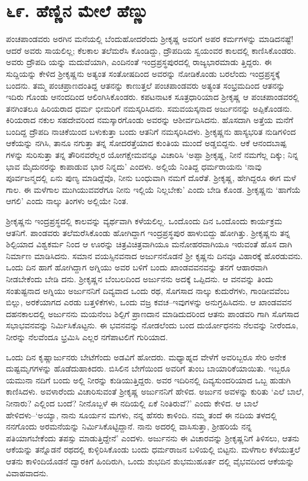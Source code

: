 
\chapter{೬೯. ಹೆಣ್ಣಿನ ಮೇಲೆ ಹೆಣ್ಣು}

ಪಂಚಪಾಂಡವರು ಅರಗಿನ ಮನೆಯಲ್ಲಿ ಬೆಂದುಹೋದರೆಂದು ಶ್ರೀಕೃಷ್ಣ ಅವರಿಗೆ ಅಪರ ಕರ್ಮಗಳನ್ನು ಮಾಡಿದನಷ್ಟೆ! ಆದರೆ ಅವರು ಸಾಯಲಿಲ್ಲ; ಕೆಲಕಾಲ ತಲೆಮರೆಸಿ ಕೊಂಡಿದ್ದು, ದ್ರೌಪದಿಯ ಸ್ವಯಂವರ ಕಾಲದಲ್ಲಿ ಕಾಣಿಸಿಕೊಂಡರು. ಅವರು ದ್ರೌಪದಿ ಯನ್ನು ಮದುವೆಯಾಗಿ, ಎಂದಿನಂತೆ ಇಂದ್ರಪ್ರಸ್ಥಪುರದಲ್ಲಿ ರಾಜ್ಯಭಾರಮಾಡು ತ್ತಿದ್ದರು. ಈ ಸುದ್ದಿಯನ್ನು ಕೇಳಿದ ಶ್ರೀಕೃಷ್ಣನು ಅತ್ಯಂತ ಸಂತೋಷದಿಂದ ಅವರನ್ನು ನೋಡಿಕೊಂಡು ಬರಲೆಂದು ಇಂದ್ರಪ್ರಸ್ಥಕ್ಕೆ ಬಂದನು. ತಮ್ಮ ಪಂಚಪ್ರಾಣದಂತಿದ್ದ ಆತನನ್ನು ಕಾಣುತ್ತಲೆ ಪಂಚಪಾಂಡವರು ಅತ್ಯಂತ ಸಂಭ್ರಮದಿಂದ ಆತನನ್ನು ಇದಿರು ಗೊಂಡು ಆನಂದದಿಂದ ಆಲಿಂಗಿಸಿಕೊಂಡರು. ಕಪಟನಾಟಕ ಸೂತ್ರಧಾರಿಯಾದ ಶ್ರೀಕೃಷ್ಣ ಆ ಪಂಚಪಾಂಡವರಲ್ಲಿ ತನಗಿಂತಲೂ ಹಿರಿಯರಾದ ಧರ್ಮ ಭೀಮರಿಗೆ ನಮಸ್ಕರಿಸಿದನು. ಸಮವಯಸ್ಕನಾದ ಅರ್ಜುನನನ್ನು ಅಪ್ಪಿಕೊಂಡನು. ಕಿರಿಯರಾದ ನಕುಲ ಸಹದೇವರಿಂದ ನಮಸ್ಕಾರಗೊಂಡು ಅವರನ್ನು ಆಶೀರ್ವದಿಸಿದನು. ಹೊಸದಾಗಿ ಅತ್ತೆಯ ಮನೆಗೆ ಬಂದಿದ್ದ ದ್ರೌಪದಿ ನಾಚಿಕೆಯಿಂದ ಬಳುಕುತ್ತಾ ಬಂದು ಆತನಿಗೆ ನಮಸ್ಕರಿಸಿದಳು. ಶ್ರೀಕೃಷ್ಣನು ಹಾಸ್ಯಭರಿತ ನುಡಿಗಳಿಂದ ಆಕೆಯನ್ನು ನಗಿಸಿ, ತಾನೂ ನಗುತ್ತಾ ತನ್ನ ಸೋದರತ್ತೆಯಾದ ಕುಂತಿಯ ಮುಂದೆ ಅಡ್ಡಬಿದ್ದನು. ಆಕೆ ಆನಂದಬಾಷ್ಪ ಗಳನ್ನು ಸುರಿಸುತ್ತಾ ತನ್ನ ತೌರಿನವರೆಲ್ಲರ ಯೋಗಕ್ಷೇಮವನ್ನೂ ವಿಚಾರಿಸಿ ‘ಅಪ್ಪಾ ಶ್ರೀಕೃಷ್ಣ, ನೀನೆ ನಮಗೆಲ್ಲ ದಿಕ್ಕು; ನಿನ್ನ ಭಾವ ಮೈದುನರನ್ನು ಕಾಪಾಡುವ ಭಾರ ನಿನ್ನದು’ ಎಂದಳು. ಅಲ್ಲಿಯೆ ನಿಂತಿದ್ದ ಧರ್ಮರಾಯನು ‘ನಾವು ಪೂರ್ವಜನ್ಮದಲ್ಲಿ ಏನು ಪುಣ್ಯ ಮಾಡಿದ್ದೆವೊ, ನೀನು ಬಂಧುವಾಗಿ ನಮಗೆ ದೊರೆತೆ. ಶ್ರೀಕೃಷ್ಣ, ಹೇಗಿದ್ದರೂ ಈಗ ಮಳೆ ಗಾಲ. ಈ ಮಳೆಗಾಲ ಮುಗಿಯುವವರೆಗೂ ನೀನು ಇಲ್ಲಿಯೆ ನಿಲ್ಲಬೇಕು’ ಎಂದು ಬೇಡಿ ಕೊಂಡ. ಶ್ರೀಕೃಷ್ಣನು ‘ಹಾಗೆಯೆ ಆಗಲಿ’ ಎಂದು ನಾಲ್ಕು ತಿಂಗಳು ಅಲ್ಲಿಯೇ ನಿಂತ.

ಶ್ರೀಕೃಷ್ಣನು ಇಂದ್ರಪ್ರಸ್ಥದಲ್ಲಿ ಕಾಲವನ್ನು ವ್ಯರ್ಥವಾಗಿ ಕಳೆಯಲಿಲ್ಲ. ಒಂದೊಂದು ದಿನ ಒಂದೊಂದು ಕಾರ್ಯಕ್ರಮ ಆತನಿಗೆ. ಪಾಂಡವರು ತಲೆಮರೆಸಿಕೊಂಡು ಹೋಗಿದ್ದಾಗ ಇಂದ್ರಪ್ರಸ್ಥಪುರ ಹಾಳುಬಿದ್ದು ಹೋಗಿತ್ತು. ಶ್ರೀಕೃಷ್ಣನು ತನ್ನ ಶಿಲ್ಪಿಯಾದ ವಿಶ್ವಕರ್ಮ ನಿಂದ ಆ ಊರನ್ನು ಚಿತ್ರವಿಚಿತ್ರವಾಗಿಯೂ ಮನೋಹರವಾಗಿಯೂ ಇರುವಂತೆ ಹೊಸ ದಾಗಿ ನಿರ್ಮಾಣ ಮಾಡಿಸಿದನು. ಸಮಾನ ವಯಸ್ಸಿನವನಾದ ಅರ್ಜುನನೊಡನೆ ಶ್ರೀ ಕೃಷ್ಣನು ದಿನವೂ ವಿಹಾರಕ್ಕೆ ಹೊರಡುವನು. ಒಂದು ದಿನ ಹಾಗೆ ಹೋಗಿದ್ದಾಗ ಅಗ್ನಿಯು ಅವರ ಬಳಿಗೆ ಬಂದು ಖಾಂಡವವನವನ್ನು ತನಗೆ ಆಹಾರವಾಗಿ ನೀಡಬೇಕೆಂದು ಬೇಡಿ ದನು. ಶ್ರೀಕೃಷ್ಣನ ಬೆಂಬಲದಿಂದ ಅರ್ಜುನನು ಅದಕ್ಕೆ ಒಪ್ಪಿದನು. ಆ ವನವನ್ನು ತಿಂದು ಸಂತುಷ್ಟನಾದ ಅಗ್ನಿಯು ಅರ್ಜುನನಿಗೆ ದಿವ್ಯವಾದ ಒಂದು ರಥ, ಸೊಗಸಾದ ನಾಲ್ಕು ಕುದುರೆಗಳು, ಗಾಂಡೀವವೆಂಬ ಬಿಲ್ಲು, ಅರಕೆಯಾಗದ ಎರಡು ಬತ್ತಳಿಕೆಗಳು, ಒಂದು ವಜ್ರ ಕವಚ–ಇವುಗಳನ್ನು ಅನುಗ್ರಹಿಸಿದನು. ಆ ಖಾಂಡವವನ ದಹನಕಾಲದಲ್ಲಿ ಅರ್ಜುನನು ಮಯನೆಂಬ ಶಿಲ್ಪಿಗೆ ಪ್ರಾಣದಾನ ಮಾಡಿದುದರಿಂದ ಆತನು ಪಾಂಡವರಿ ಗಾಗಿ ಸೊಗಸಾದ ಸಭಾಭವನವನ್ನು ನಿರ್ಮಿಸಿಕೊಟ್ಟನು. ಈ ಭವನವನ್ನು ನೋಡಲೆಂದು ಬಂದ ದುರ್ಯೋಧನನು ನೆಲವನ್ನು ನೀರೆಂದೂ, ನೀರನ್ನು ನೆಲವೆಂದೂ ಭ್ರಮಿಸಿ ಎಲ್ಲರ ನಗೆಪಾಟಲಿಗೆ ಗುರಿಯಾದ.

ಒಂದು ದಿನ ಕೃಷ್ಣಾರ್ಜುನರು ಬೇಟೆಗೆಂದು ಅಡವಿಗೆ ಹೋದರು. ಮಧ್ಯಾಹ್ನದ ವೇಳೆಗೆ ಅವರಿಬ್ಬರೂ ಸೇರಿ ಅನೇಕ ದುಷ್ಟಮೃಗಗಳನ್ನು ಹೊಡೆದುಹಾಕಿದರು. ಬಿಸಿಲಿನ ಬೇಗೆಯಿಂದ ಅವರಿಗೆ ತುಂಬ ಬಾಯಾರಿಕೆಯಾಯಿತು. ಇಬ್ಬರೂ ಯಮುನಾ ನದಿಗೆ ಬಂದು ಅಲ್ಲಿ ನೀರನ್ನು ಕುಡಿಯುತ್ತಿದ್ದರು. ಅವರ ಇದಿರಿನಲ್ಲಿ ದಿವ್ಯಸುಂದರಿಯಾದ ಒಬ್ಬ ಹುಡುಗಿ ಕಾಣಿಸಿದಳು. ಅವಳಾರೆಂದು ವಿಚಾರಿಸುವಂತೆ ಶ್ರೀಕೃಷ್ಣ ಅರ್ಜುನನಿಗೆ ಹೇಳಿದ. ಅರ್ಜುನ ಅವಳನ್ನು ಕುರಿತು ‘ಎಲೆ ಬಾಲೆ, ನೀನಾರು? ಎಲ್ಲಿಂದ ಬಂದೆ? ನೀನೊಬ್ಬಳೆ ಈ ನದಿಯಲ್ಲಿ ಏಕೆ ನಿಂತಿರುವೆ?’ ಎಂದು ಕೇಳಿದ. ಆ ಬಾಲೆ ಹೇಳಿದಳು–‘ಅಯ್ಯಾ, ನಾನು ಸೂರ್ಯನ ಮಗಳು, ನನ್ನ ಹೆಸರು ಕಾಳಿಂದಿ. ನಮ್ಮ ತಂದೆ ಈ ನದಿಯ ತಳದಲ್ಲಿ ನನಗೊಂದು ಅರಮನೆಯನ್ನು ನಿರ್ಮಿಸಿಕೊಟ್ಟಿದ್ದಾನೆ. ನಾನು ಅದರಲ್ಲಿ ವಾಸಿಸುತ್ತಾ, ಶ್ರೀಹರಿಯೆ ನನ್ನ ಪತಿಯಾಗಬೇಕೆಂದು ತಪಸ್ಸು ಮಾಡುತ್ತಿದ್ದೇನೆ’ ಎಂದಳು. ಅರ್ಜುನನು ಈ ವಿಚಾರವನ್ನು ಶ್ರೀಕೃಷ್ಣನಿಗೆ ತಿಳಿಸಲು, ಆತನು ಆಕೆಯನ್ನು ತನ್ನೊಡನೆ ರಥದಲ್ಲಿ ಕುಳ್ಳಿರಿಸಿಕೊಂಡು ಬಂದು ಧರ್ಮರಾಜನ ಬಳಿಯಲ್ಲಿ ಬಿಟ್ಟನು. ಮಳೆಗಾಲ ಕಳೆಯುತ್ತಲೆ ಆತನು ಕಾಳಿಂದಿಯೊಡನೆ ದ್ವಾರಕಿಗೆ ಹಿಂದಿರುಗಿ, ಒಂದು ಶುಭದಿನ ಶುಭಮುಹೂರ್ತ ದಲ್ಲಿ ವೈಭವದಿಂದ ಆಕೆಯನ್ನು ವಿವಾಹವಾದನು.

